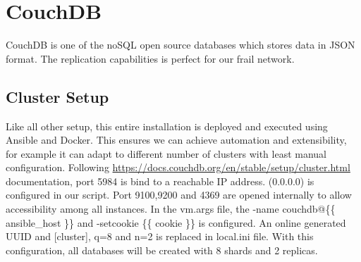 \section{CouchDB}
CouchDB is one of the noSQL open source databases which stores data in JSON format. The replication capabilities is perfect for our frail network. 

\subsection{Cluster Setup}
 Like all other setup, this entire installation is deployed and executed using Ansible and Docker. This ensures we can achieve automation and extensibility, for example it can adapt to different number of clusters with least manual configuration. Following \url{https://docs.couchdb.org/en/stable/setup/cluster.html} documentation, port 5984 is bind to a reachable IP address. (0.0.0.0) is configured in our script. Port 9100,9200 and 4369 are opened internally to allow accessibility among all instances. In the vm.args file, the -name couchdb@\{\{ ansible\_host \}\} and -setcookie \{\{ cookie \}\} is configured. An online generated UUID and [cluster], q=8 and n=2 is replaced in local.ini file. With this configuration, all databases will be created with 8 shards and 2 replicas. 

